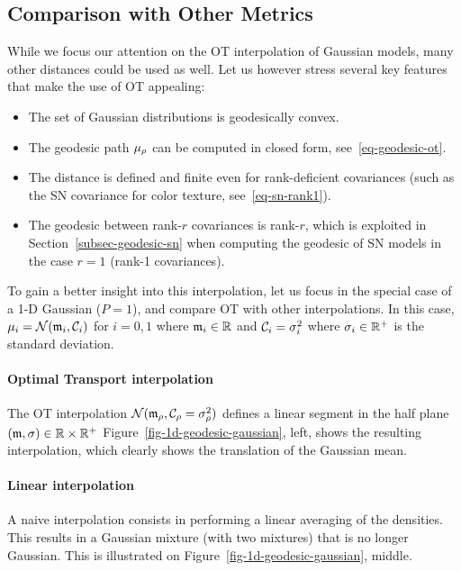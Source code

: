 \subsection{Comparison with Other Metrics}
\label{subsec-comparison-others}

While we focus our attention on the OT interpolation of Gaussian models, many other distances could be used as well. Let us however stress several key features that make the use of OT appealing:
\begin{itemize}
	\item The set of Gaussian distributions is geodesically convex.
	\item The geodesic path $\mu_\rho$ can be computed in closed form, see~\eqref{eq-geodesic-ot}.
	\item The distance is defined and finite even for rank-deficient covariances (such as the SN covariance for color texture, see~\eqref{eq-sn-rank1}).
	\item The geodesic between rank-$r$ covariances is rank-$r$, which is exploited in Section~\ref{subsec-geodesic-sn} when computing the geodesic of SN models in the case $r=1$ (rank-1 covariances).
\end{itemize}

To gain a better insight into this interpolation, let us focus in the special case of a 1-D Gaussian ($P=1$), and compare OT with other interpolations. In this case, $\mu_i = \mathcal{N}({\frak m}_i,\mathcal{C}_i)$ for $i=0,1$ where ${\frak m}_i \in \mathbb{R}$ and $\mathcal{C}_i = \sigma_i^2$ where $\sigma_i \in \mathbb{R}^+$ is the standard deviation.


\paragraph{Optimal Transport interpolation}
The OT interpolation $\mathcal{N}({\frak m}_\rho,\mathcal{C}_\rho=\sigma_\rho^2)$ defines a linear segment in the half plane $({\frak m},\sigma) \in \mathbb{R} \times \mathbb{R}^+$
Figure~\ref{fig-1d-geodesic-gaussian}, left, shows the resulting interpolation, which clearly shows the translation of the Gaussian mean.


\paragraph{Linear interpolation} A naive interpolation consists in performing a linear averaging of the densities. This results in a Gaussian mixture (with two mixtures) that is no longer Gaussian. This is illustrated on Figure~\ref{fig-1d-geodesic-gaussian}, middle.

